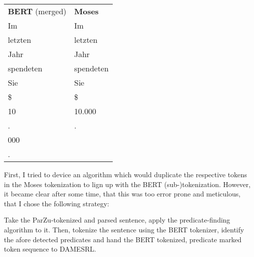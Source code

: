 \begin{tabularx}{\textwidth}{@{}l<{}@{\ }X@{}}
  \textbf{BERT} (merged) & \textbf{Moses}  \\
  Im                     & Im              \\
  letzten                & letzten         \\
  Jahr                   & Jahr            \\
  spendeten              & spendeten       \\
  Sie                    & Sie             \\
  \$                     & \$              \\
  10                     & 10.000          \\
  .                      & .               \\
  000                    &                 \\
  .                      &                 \\
\end{tabularx}

First, I tried to device an algorithm which would duplicate the respective tokens
in the Moses tokenization to lign up with the BERT (sub-)tokenization. However,
it became clear after some time, that this was too error prone and meticulous,
that I chose the following strategy:

Take the ParZu-tokenized and parsed sentence, apply the predicate-finding algorithm to it.
Then, tokenize the sentence using the BERT tokenizer, identify the afore detected
predicates and hand the BERT tokenized, predicate marked token sequence to DAMESRL.



